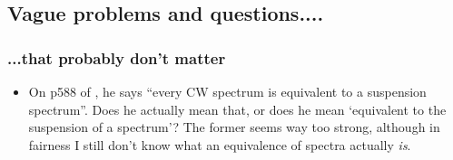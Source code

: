\documentclass{MetricNotes2023}
\def\bb{\ensuremath\mathbb}
\def\subq{\ensuremath\subseteq}
\def\inte{\ensuremath\mathbb{Z}}
\begin{document}
\subsection{Vague problems and questions....}

\subsubsection{...that probably don't matter}

\begin{itemize}


\item On p588 of \autocite{hatcher5}, he says ``every CW spectrum is equivalent to a suspension spectrum''. Does he actually mean that, or does he mean `equivalent to the suspension of a spectrum'? The former seems way too strong, although in fairness I still don't know what an equivalence of spectra actually \textit{is}. 



\end{itemize}
\end{document}
